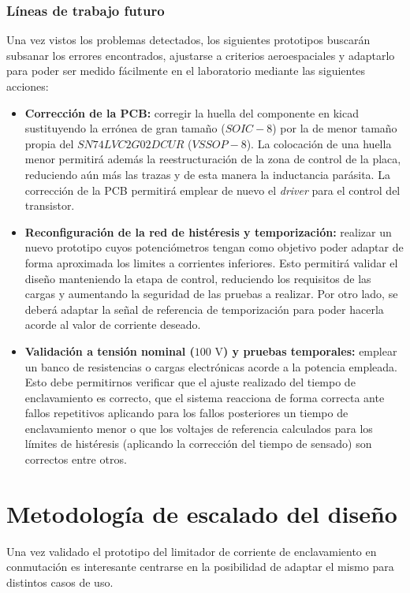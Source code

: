 \documentclass[12pt]{report} %
\begin{document}
\subsection{Líneas de trabajo futuro}
\label{subsec:trabajo_futuro}
Una vez vistos los problemas detectados, los siguientes prototipos buscarán subsanar los errores encontrados, ajustarse a criterios aeroespaciales y adaptarlo para poder ser medido fácilmente en el laboratorio mediante las siguientes acciones: 
\begin{itemize}[label=\arabic*°.]
    \item \textbf{Corrección de la PCB:} corregir la huella del componente en kicad sustituyendo la errónea de gran tamaño ($SOIC-8$) por la de menor tamaño propia del $SN74LVC2G02DCUR$ ($VSSOP-8$). La colocación de una huella menor permitirá además la reestructuración de la zona de control de la placa, reduciendo aún más las trazas y de esta manera la inductancia parásita. La corrección de la PCB permitirá emplear de nuevo el \textit{driver} para el control del transistor.
    \item \textbf{Reconfiguración de la red de histéresis y temporización:} realizar un nuevo prototipo cuyos potenciómetros tengan como objetivo poder adaptar de forma aproximada los limites a corrientes inferiores. Esto permitirá validar el diseño manteniendo la etapa de control, reduciendo los requisitos de las cargas y aumentando la seguridad de las pruebas a realizar. Por otro lado, se deberá adaptar la señal de referencia de temporización para poder hacerla acorde al valor de corriente deseado.
    \item \textbf{Validación a tensión nominal ($100\text{ V}$) y pruebas temporales:} emplear un banco de resistencias o cargas electrónicas acorde a la potencia empleada. Esto debe permitirnos verificar que el ajuste realizado del tiempo de enclavamiento es correcto, que el sistema reacciona de forma correcta ante fallos repetitivos aplicando para los fallos posteriores un tiempo de enclavamiento menor o que los voltajes de referencia calculados para los límites de histéresis (aplicando la corrección del tiempo de sensado) son correctos entre otros. 
\end{itemize}

\chapter{Metodología de escalado del diseño}
\label{chapter:Escalado}
Una vez validado el prototipo del limitador de corriente de enclavamiento en conmutación es interesante centrarse en la posibilidad de adaptar el mismo para distintos casos de uso. 
\end{document}
